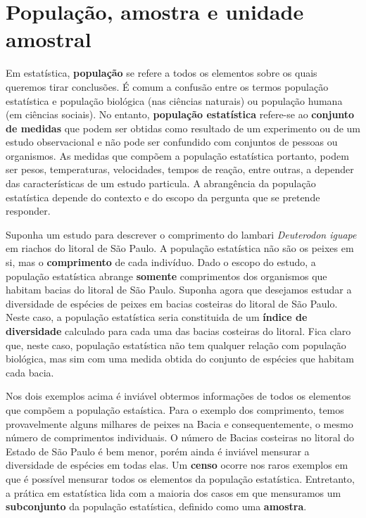 \documentclass[
]{book}
\begin{document}
\hypertarget{populauxe7uxe3o-amostra-e-unidade-amostral}{%
\section{População, amostra e unidade amostral}\label{populauxe7uxe3o-amostra-e-unidade-amostral}}

Em estatística, \textbf{população} se refere a todos os elementos sobre os quais queremos tirar conclusões. É comum a confusão entre os termos população estatística e população biológica (nas ciências naturais) ou população humana (em ciências sociais). No entanto, \textbf{população estatística} refere-se ao \textbf{conjunto de medidas} que podem ser obtidas como resultado de um experimento ou de um estudo observacional e não pode ser confundido com conjuntos de pessoas ou organismos. As medidas que compõem a população estatística portanto, podem ser pesos, temperaturas, velocidades, tempos de reação, entre outras, a depender das características de um estudo particula. A abrangência da população estatística depende do contexto e do escopo da pergunta que se pretende responder.

Suponha um estudo para descrever o comprimento do lambari \emph{Deuterodon iguape} em riachos do litoral de São Paulo. A população estatística não são os peixes em si, mas o \textbf{comprimento} de cada indivíduo. Dado o escopo do estudo, a população estatística abrange \textbf{somente} comprimentos dos organismos que habitam bacias do litoral de São Paulo. Suponha agora que desejamos estudar a diversidade de espécies de peixes em bacias costeiras do litoral de São Paulo. Neste caso, a população estatística seria constituida de um \textbf{índice de diversidade} calculado para cada uma das bacias costeiras do litoral. Fica claro que, neste caso, população estatística não tem qualquer relação com população biológica, mas sim com uma medida obtida do conjunto de espécies que habitam cada bacia.

Nos dois exemplos acima é inviável obtermos informações de todos os elementos que compõem a população estaística. Para o exemplo dos comprimento, temos provavelmente alguns milhares de peixes na Bacia e consequentemente, o mesmo número de comprimentos individuais. O número de Bacias costeiras no litoral do Estado de São Paulo é bem menor, porém ainda é inviável mensurar a diversidade de espécies em todas elas. Um \textbf{censo} ocorre nos raros exemplos em que é possível mensurar todos os elementos da população estatística. Entretanto, a prática em estatística lida com a maioria dos casos em que mensuramos um \textbf{subconjunto} da população estatística, definido como uma \textbf{amostra}.
\end{document}

